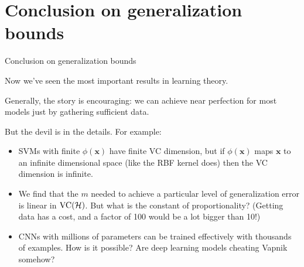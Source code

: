 \documentclass{beamer}
\renewcommand{\vec}[1]{\boldsymbol{#1}}
\begin{document}
\section{Conclusion on generalization bounds}

\begin{frame}{Conclusion on generalization bounds}

  Now we've seen the most important results in learning theory.

  \medskip

  Generally, the story is encouraging: \alert{we can achieve near
    perfection} for most models just by \alert{gathering sufficient
    data}.

  \medskip

  But the devil is in the details. For example:
  \begin{itemize}
  \item SVMs with finite $\phi(\vec{x})$ have finite VC dimension, but
    if $\phi(\vec{x})$ maps $\vec{x}$ to an infinite dimensional space (like
    the RBF kernel does) then the VC dimension is \alert{infinite}.
  \item We find that the $m$ needed to achieve a particular level of
    generalization error is linear in $\text{VC}({\cal H})$. But what
    is the constant of proportionality? (Getting data has a cost, and
    a factor of 100 would be a lot bigger than 10!)
  \item CNNs with millions of parameters can be trained effectively
    with thousands of examples. How is it possible? Are deep learning
    models cheating Vapnik somehow?
  \end{itemize}

\end{frame}
\end{document}
